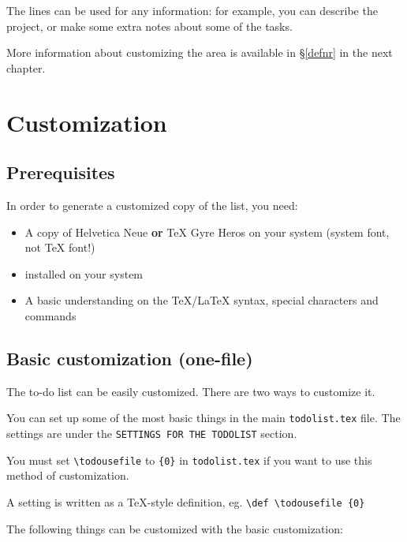 \documentclass[a4paper,english]{report}
\numberwithin{equation}{section}
\newcommand{\ltcs}[1]{\texttt{\textbackslash#1}}
\begin{document}
The lines can be used for any information: for example, you can describe the project, or make some extra notes about some of the tasks.

More information about customizing the area is available in §\ref{defnr} in the next chapter.

\chapter{Customization}
\label{customization}
\section{Prerequisites}

In order to generate a customized copy of the list, you need:

\begin{itemize}
\item A copy of Helvetica Neue \textbf{or} \TeX{} Gyre Heros on your system (system font, not \TeX{} font!)
\item \XeLaTeX{} installed on your system
\item A basic understanding on the \TeX{}/\LaTeX{} syntax, special characters and commands
\end{itemize}

\section{Basic customization (one-file)}
\label{basic}

The to-do list can be easily customized.  There are two ways to customize it.

You can set up some of the most basic things in the main \texttt{todolist.tex} file.  The settings are under the \texttt{SETTINGS FOR THE TODOLIST} section.

You must set \ltcs{todousefile} to \texttt{\{0\}} in \texttt{todolist.tex} if you want to use this method of customization.

A setting is written as a \TeX-style definition, eg. \texttt{\ltcs{def} \ltcs{todousefile} \{0\}}

The following things can be customized with the basic customization:
\end{document}
